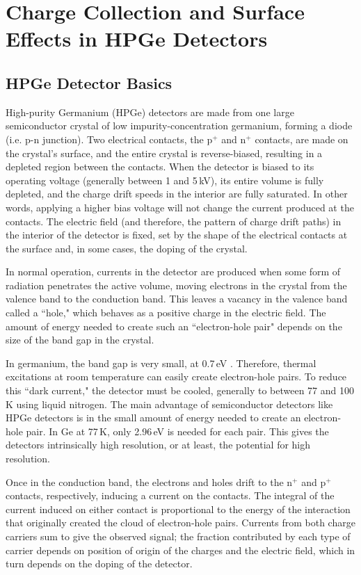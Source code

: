 
 
\chapter {Charge Collection and Surface Effects in HPGe Detectors}\label{ch:HPGe_det}
\section{HPGe Detector Basics}
High-purity Germanium (HPGe) detectors are made from one large semiconductor crystal of low impurity-concentration germanium, forming a diode (i.e. p-n junction). Two electrical contacts, the p$^+$ and n$^+$ contacts, are made on the crystal's surface, and the entire crystal is reverse-biased, resulting in a depleted region between the contacts. When the detector is biased to its operating voltage (generally between 1 and 5\,kV), its entire volume is fully depleted, and the charge drift speeds in the interior are fully saturated. In other words, applying a higher bias voltage will not change the current produced at the contacts. The electric field (and therefore, the pattern of charge drift paths) in the interior of the detector is fixed, set by the shape of the electrical contacts at the surface and, in some cases, the doping of the crystal. 

In normal operation, currents in the detector are produced when some form of radiation penetrates the active volume, moving electrons in the crystal from the valence band to the conduction band. This leaves a vacancy in the valence band called a ``hole," which behaves as a positive charge in the electric field. The amount of energy needed to create such an ``electron-hole pair" depends on the size of the band gap in the crystal. 

In germanium, the band gap is very small, at 0.7\,eV \cite{Bertolini1968}. Therefore, thermal excitations at room temperature can easily create electron-hole pairs. To reduce this ``dark current," the detector must be cooled, generally to between 77 and 100\,K using liquid nitrogen. The main advantage of semiconductor detectors like HPGe detectors is in the small amount of energy needed to create an electron-hole pair. In Ge at 77\,K, only 2.96\,eV is needed for each pair. This gives the detectors intrinsically high resolution, or at least, the potential for high resolution. 

Once in the conduction band, the electrons and holes drift to the n$^+$ and p$^+$ contacts, respectively, inducing a current on the contacts. The integral of the current induced on either contact is proportional to the energy of the interaction that originally created the cloud of electron-hole pairs. Currents from both charge carriers sum to give the observed signal; the fraction contributed by each type of carrier depends on position of origin of the charges and the electric field, which in turn depends on the doping of the detector. 

